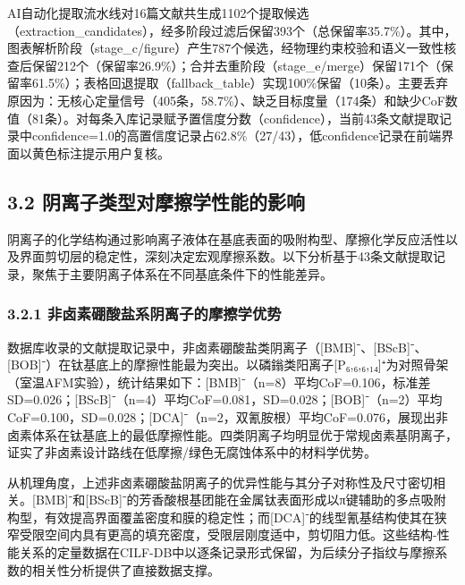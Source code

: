 AI自动化提取流水线对16篇文献共生成1102个提取候选（extraction\_candidates），经多阶段过滤后保留393个（总保留率35.7\%）。其中，图表解析阶段（stage\_c/figure）产生787个候选，经物理约束校验和语义一致性核查后保留212个（保留率26.9\%）；合并去重阶段（stage\_e/merge）保留171个（保留率61.5\%）；表格回退提取（fallback\_table）实现100\%保留（10条）。主要丢弃原因为：无核心定量信号（405条，58.7\%）、缺乏目标度量（174条）和缺少CoF数值（81条）。对每条入库记录赋予置信度分数（confidence），当前43条文献提取记录中confidence=1.0的高置信度记录占62.8\%（27/43），低confidence记录在前端界面以黄色标注提示用户复核。

\hypertarget{ux9634ux79bbux5b50ux7c7bux578bux5bf9ux6469ux64e6ux5b66ux6027ux80fdux7684ux5f71ux54cd}{%
\subsection{3.2 阴离子类型对摩擦学性能的影响}\label{ux9634ux79bbux5b50ux7c7bux578bux5bf9ux6469ux64e6ux5b66ux6027ux80fdux7684ux5f71ux54cd}}

阴离子的化学结构通过影响离子液体在基底表面的吸附构型、摩擦化学反应活性以及界面剪切层的稳定性，深刻决定宏观摩擦系数。以下分析基于43条文献提取记录，聚焦于主要阴离子体系在不同基底条件下的性能差异。

\hypertarget{ux975eux5364ux7d20ux787cux9178ux76d0ux7cfbux9634ux79bbux5b50ux7684ux6469ux64e6ux5b66ux4f18ux52bf}{%
\subsubsection{3.2.1 非卤素硼酸盐系阴离子的摩擦学优势}\label{ux975eux5364ux7d20ux787cux9178ux76d0ux7cfbux9634ux79bbux5b50ux7684ux6469ux64e6ux5b66ux4f18ux52bf}}

数据库收录的文献提取记录中，非卤素硼酸盐类阴离子（{[}BMB{]}⁻、{[}BScB{]}⁻、{[}BOB{]}⁻）在钛基底上的摩擦性能最为突出。以磷鎓类阳离子{[}P₆,₆,₆,₁₄{]}⁺为对照骨架（室温AFM实验），统计结果如下：{[}BMB{]}⁻（n=8）平均CoF=0.106，标准差 SD=0.026；{[}BScB{]}⁻（n=4）平均CoF=0.081，SD=0.028；{[}BOB{]}⁻（n=2）平均CoF=0.100，SD=0.028；{[}DCA{]}⁻（n=2，双氰胺根）平均CoF=0.076，展现出非卤素体系在钛基底上的最低摩擦性能。四类阴离子均明显优于常规卤素基阴离子，证实了非卤素设计路线在低摩擦/绿色无腐蚀体系中的材料学优势。

从机理角度，上述非卤素硼酸盐阴离子的优异性能与其分子对称性及尺寸密切相关。{[}BMB{]}⁻和{[}BScB{]}⁻的芳香酸根基团能在金属钛表面形成以π键辅助的多点吸附构型，有效提高界面覆盖密度和膜的稳定性；而{[}DCA{]}⁻的线型氰基结构使其在狭窄受限空间内具有更高的填充密度，受限层刚度适中，剪切阻力低。这些结构-性能关系的定量数据在CILF-DB中以逐条记录形式保留，为后续分子指纹与摩擦系数的相关性分析提供了直接数据支撑。

